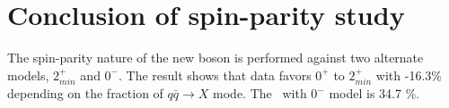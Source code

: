 \section{Conclusion of spin-parity study} 

The spin-parity nature of the new boson is performed against two alternate 
models, $2_{min}^+$ and $0^-$. The result shows that data favors $0^+$ to 
$2_{min}^+$ with -16.3\% depending on the fraction of 
$q\bar{q}\rightarrow X$ mode. The \CLs\ with $0^-$ model is 34.7 \%.  


